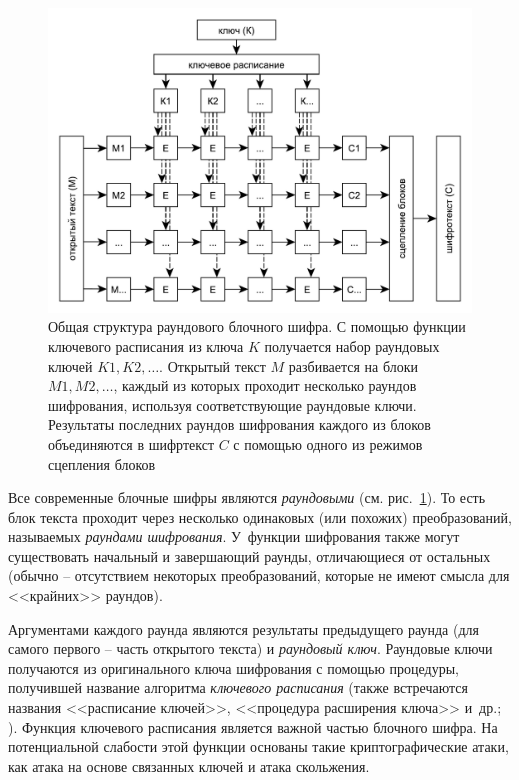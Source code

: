 \begin{figure}[!b]
	\centering
	\includegraphics[width=1\textwidth]{pic/block-cipher}
  \caption{Общая структура раундового блочного шифра. С помощью функции ключевого расписания из ключа $K$ получается набор раундовых ключей $K1, K2, \dots$. Открытый текст $M$ разбивается на блоки $M1, M2, \dots$, каждый из которых проходит несколько раундов шифрования, используя соответствующие раундовые ключи. Результаты последних раундов шифрования каждого из блоков объединяются в шифртекст $C$ с помощью одного из режимов сцепления блоков}
  \label{fig:block-cipher}
\end{figure}

Все современные блочные шифры являются \emph{раундовыми} (см. рис.~\ref{fig:block-cipher}). То есть блок текста проходит через несколько одинаковых (или похожих) преобразований, называемых \emph{раундами шифрования}. У~функции шифрования также могут существовать начальный и завершающий раунды, отличающиеся от остальных (обычно -- отсутствием некоторых преобразований, которые не имеют смысла для <<крайних>> раундов).

Аргументами каждого раунда являются результаты предыдущего раунда (для самого первого -- часть открытого текста) и \emph{раундовый ключ}. Раундовые ключи получаются из оригинального ключа шифрования с помощью процедуры, получившей название алгоритма \emph{ключевого расписания} (также встречаются названия <<расписание ключей>>, <<процедура расширения ключа>> и~др.; ). Функция ключевого расписания является важной частью блочного шифра. На потенциальной слабости этой функции основаны такие криптографические атаки, как атака на основе связанных ключей и атака скольжения.

